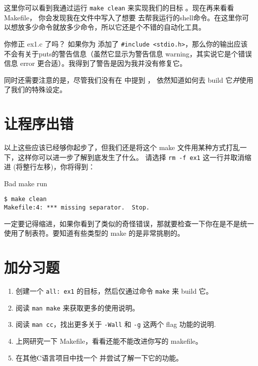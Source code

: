 这里你可以看到我通过运行 \verb|make clean| 来实现我们的目标 。现在再来看看 Makefile， 你会发现我在文件中写入了想要  去帮我运行的shell命令。在这里你可以想放多少命令就放多少命令，所以它还是个不错的自动化工具。

\begin{aside}{你修正 ex1.c 了吗？}
如果你为  添加了 \verb|#include <stdio.h>|，那么你的输出应该不会有关于puts的警告信息（虽然它显示为警告信息 warning，其实说它是个错误信息 error 更合适）。我得到了警告是因为我并没有修复它。
\end{aside}

同时还需要注意的是，尽管我们没有在  中提到  ， 依然知道如何去 build 它\emph{并}使用了我们的特殊设定。


\section{让程序出错}

以上这些应该已经够你起步了，但我们还是将这个 make 文件用某种方式打乱一下，这样你可以进一步了解到底发生了什么。 请选择 \verb|rm -f ex1| 这一行并取消缩进 (将整行左移)，你将得到：

\begin{Terminal}{Bad make run}
\begin{lstlisting}
$ make clean
Makefile:4: *** missing separator.  Stop.
\end{lstlisting}
\end{Terminal}

一定要记得缩进，如果你看到了类似的奇怪错误，那就要检查一下你在是不是统一使用了制表符。要知道有些类型的 make 的是非常挑剔的。


\section{加分习题}

\begin{enumerate}
\item 创建一个 \verb|all: ex1| 的目标，然后仅通过命令 \verb|make| 来 build 它。
\item 阅读 \verb|man make| 来获取更多的使用说明。
\item 阅读 \verb|man cc|，找出更多关于 \verb|-Wall| 和 \verb|-g| 这两个 flag 功能的说明.
\item 上网研究一下 Makefile，看看还能不能改进你写的 makefile。
\item 在其他C语言项目中找一个  并尝试了解一下它的功能。
\end{enumerate}

